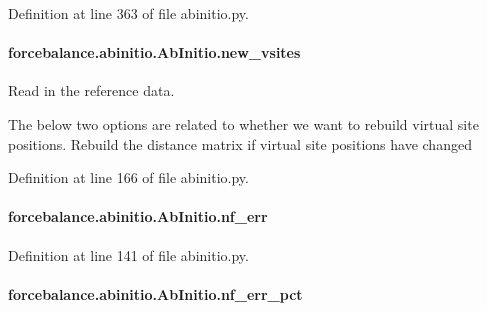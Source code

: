 Definition at line 363 of file abinitio.\-py.

\hypertarget{classforcebalance_1_1abinitio_1_1AbInitio_a64f1aeadac4d7b09424c20b83e5ad5af}{
\paragraph[{new\-\_\-vsites}]{\setlength{\rightskip}{0pt plus 5cm}forcebalance.\-abinitio.\-Ab\-Initio.\-new\-\_\-vsites\hspace{0.3cm}{\ttfamily [inherited]}}}\label{classforcebalance_1_1abinitio_1_1AbInitio_a64f1aeadac4d7b09424c20b83e5ad5af}


Read in the reference data. 

The below two options are related to whether we want to rebuild virtual site positions. Rebuild the distance matrix if virtual site positions have changed 

Definition at line 166 of file abinitio.\-py.

\hypertarget{classforcebalance_1_1abinitio_1_1AbInitio_a89de620e9aa500481c9e1ded99e14f72}{
\paragraph[{nf\-\_\-err}]{\setlength{\rightskip}{0pt plus 5cm}forcebalance.\-abinitio.\-Ab\-Initio.\-nf\-\_\-err\hspace{0.3cm}{\ttfamily [inherited]}}}\label{classforcebalance_1_1abinitio_1_1AbInitio_a89de620e9aa500481c9e1ded99e14f72}


Definition at line 141 of file abinitio.\-py.

\hypertarget{classforcebalance_1_1abinitio_1_1AbInitio_a184edac2cb27a999c363595ea59d8163}{
\paragraph[{nf\-\_\-err\-\_\-pct}]{\setlength{\rightskip}{0pt plus 5cm}forcebalance.\-abinitio.\-Ab\-Initio.\-nf\-\_\-err\-\_\-pct\hspace{0.3cm}{\ttfamily [inherited]}}}\label{classforcebalance_1_1abinitio_1_1AbInitio_a184edac2cb27a999c363595ea59d8163}


